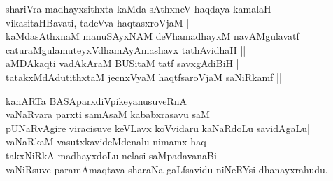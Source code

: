 \begin{entry}
\gl{}
\info{}{}{}{}
\begin{shl}
shariVra madhayxsithxta kaMda sAthxneV haqdaya kamalaH\\
vikasitaHBavati, tadeVva haqtasxroVjaM |\\
kaMdasAthxnaM manuSAyxNAM deVhamadhayxM navAMgulavatf |\\
caturaMgulamuteyxVdhamAyAmashavx tathAvidhaH ||\\
aMDAkaqti vadAkAraM BUSitaM tatf savxgAdiBiH |\\
tatakxMdAdutithxtaM jecnxVyaM haqtfsaroVjaM saNiRkamf ||
\end{shl}
\end{entry}

\begin{entry}
\begin{shl}
kanARTa BASAparxdiVpikeyanusuveRnA\\
vaNaRvara parxti samAsaM kababxrasavu saM\\
pUNaRvAgire viracisuve keVLavx koVvidaru kaNaRdoLu savidAgaLu|\\
vaNaRkaM vasutxkavideMdenalu nimamx haq\\
takxNiRkA madhayxdoLu nelasi saMpadavanaBi\\
vaNiRsuve paramAmaqtava sharaNa gaLfsavidu niNeRYsi dhanayxrahudu.
\end{shl}
\end{entry}

\begin{entry}
\end{entry}

\begin{entry}
\end{entry}

